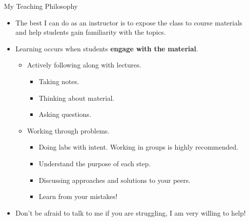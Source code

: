 {}\documentclass[letterpaper,
compress,
xcolor=x11names,
]{beamer}
\begin{document}
\begin{frame}{My Teaching Philosophy}
	\begin{itemize}
	\item The best I can do as an instructor is to expose the class to course materials and help students gain familiarity with the topics.
	\item Learning occurs when students \textbf{engage with the material}.
	\begin{itemize}
		\item Actively following along with lectures.
		\begin{itemize}
			\footnotesize
			\item Taking notes.
			\item Thinking about material.
			\item Asking questions.
		\end{itemize}
		\item Working through problems.
		\begin{itemize}
			\footnotesize
			\item Doing labs with intent. Working in groups is highly recommended.
			\item Understand the purpose of each step.
			\item Discussing approaches and solutions to your peers.
			\item Learn from your mistakes!
		\end{itemize}
	\end{itemize}
	\item Don't be afraid to talk to me if you are struggling, I am very willing to help!
	\end{itemize}
\end{frame}
\end{document}
